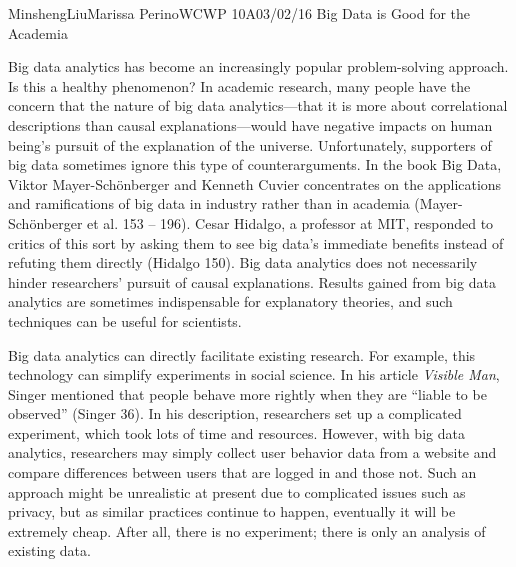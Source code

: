 \documentclass[12pt,letterpaper]{article}
\begin{document}
\begin{mla}{Minsheng}{Liu}{Marissa Perino}{WCWP 10A}{03/02/16}
  {Big Data is Good for the Academia}

Big data analytics has become an increasingly popular problem-solving
approach. Is this a healthy phenomenon? In academic research, many
people have the concern that the nature of big data analytics---that it
is more about correlational descriptions than causal
explanations---would have negative impacts on human being's pursuit of
the explanation of the universe. Unfortunately, supporters of big data
sometimes ignore this type of counterarguments. In the book Big Data,
Viktor Mayer-Schönberger and Kenneth Cuvier concentrates on the
applications and ramifications of big data in industry rather than in
academia (Mayer-Schönberger et al. 153 -- 196). Cesar Hidalgo, a
professor at MIT, responded to critics of this sort by asking them to
see big data's immediate benefits instead of refuting them directly
(Hidalgo 150). Big data analytics does not necessarily hinder
researchers' pursuit of causal explanations. Results gained from big
data analytics are sometimes indispensable for explanatory theories, and
such techniques can be useful for scientists.

Big data analytics can directly facilitate existing research. For
example, this technology can simplify experiments in social science. In
his article \emph{Visible Man}, Singer mentioned that people behave more
rightly when they are ``liable to be observed'' (Singer 36). In his
description, researchers set up a complicated experiment, which took
lots of time and resources. However, with big data analytics,
researchers may simply collect user behavior data from a website and
compare differences between users that are logged in and those not. Such
an approach might be unrealistic at present due to complicated issues
such as privacy, but as similar practices continue to happen, eventually
it will be extremely cheap. After all, there is no experiment; there is
only an analysis of existing data.


\end{mla}
\end{document}
